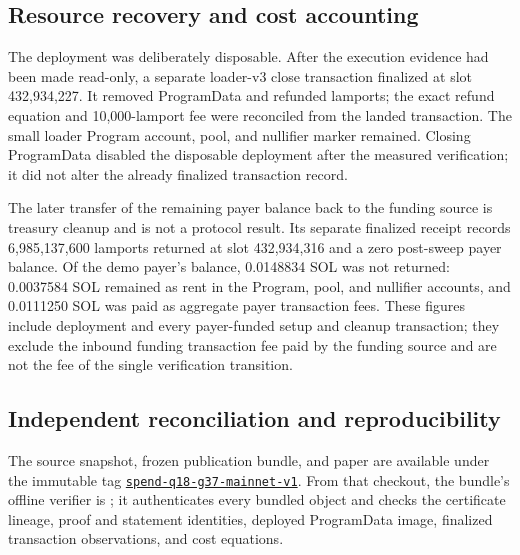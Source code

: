 \subsection{Resource recovery and cost accounting}
\label{sec:evaluation-cleanup}

The deployment was deliberately disposable.  After the execution evidence
had been made read-only, a separate loader-v3 close transaction finalized at
slot 432,934,227.  It removed ProgramData and refunded
\ProfileProgramDataRefundLamports{} lamports; the exact refund equation and
10,000-lamport fee were reconciled from the landed transaction.  The small
loader Program account, pool, and nullifier marker remained.  Closing
ProgramData disabled the disposable deployment after the measured
verification; it did not alter the already finalized transaction record.

The later transfer of the remaining payer balance back to the funding source
is treasury cleanup and is not a protocol result.  Its separate finalized
receipt records 6,985,137,600 lamports returned at slot 432,934,316 and a zero
post-sweep payer balance.  Of the demo payer's balance, 0.0148834 SOL was not
returned: 0.0037584 SOL remained as rent in the Program, pool, and nullifier
accounts, and 0.0111250 SOL was paid as aggregate payer transaction fees.
These figures include deployment and every payer-funded setup and cleanup
transaction; they exclude the inbound funding transaction fee paid by the
funding source and are not the fee of the single verification transition.

\subsection{Independent reconciliation and reproducibility}
\label{sec:evaluation-reproduction}

The source snapshot, frozen publication bundle, and paper are available under
the immutable tag
\href{https://github.com/DJBarker87/zk/tree/aspis-spend-q18-g37-mainnet-v1}{\texttt{spend-q18-g37-mainnet-v1}}.
From that checkout, the bundle's offline verifier is
; it authenticates every
bundled object and checks the certificate lineage, proof and statement
identities, deployed ProgramData image, finalized transaction observations,
and cost equations.

